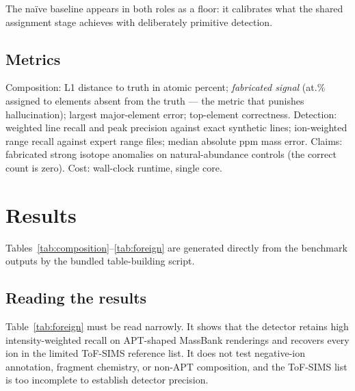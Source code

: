 \documentclass[11pt]{article}
\begin{document}
The na\"ive baseline appears in both roles as a floor: it calibrates what
the shared assignment stage achieves with deliberately primitive detection.

\subsection{Metrics}
Composition: L1 distance to truth in atomic percent; \emph{fabricated
signal} (at.\% assigned to elements absent from the truth ---
the metric that punishes hallucination); largest major-element error;
top-element correctness. Detection: weighted line recall and peak
precision against exact synthetic lines; ion-weighted range recall
against expert range files; median absolute ppm mass error. Claims:
fabricated strong isotope anomalies on natural-abundance controls (the
correct count is zero). Cost: wall-clock runtime, single core.

\section{Results}
\label{sec:results}

Tables~\ref{tab:composition}--\ref{tab:foreign} are generated directly
from the benchmark outputs by the bundled table-building script.















\subsection{Reading the results}
Table~\ref{tab:foreign} must be read narrowly. It shows that the detector
retains high intensity-weighted recall on APT-shaped MassBank renderings and
recovers every ion in the limited ToF-SIMS reference list. It does not test
negative-ion annotation, fragment chemistry, or non-APT composition, and
the ToF-SIMS list is too incomplete to establish detector precision.
\end{document}
